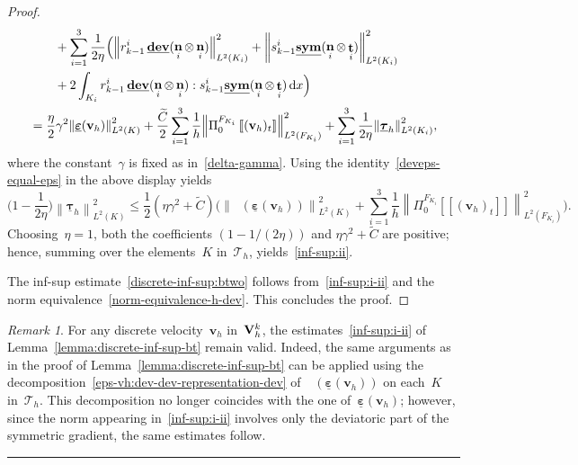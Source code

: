 \documentclass[a4paper,twoside,10pt]{article}
\theoremstyle{plain}
\theoremstyle{remark}
\newtheorem{remark}[theorem]{Remark}
\theoremstyle{definition}
\numberwithin{equation}{section}
\numberwithin{figure}{section}
\newcommand{\eremk}{\hbox{}\hfill\rule{0.8ex}{0.8ex}}
\newcommand{\Norm}[1]{{\left\|{#1} \right\|}}
\newcommand{\jump}[1]{\left[\!\left[#1\right]\!\right]}
\newcommand{\Tauh}{\mathcal{T}_h}
\newcommand{\K}{K}
\newcommand{\F}{F}
\newcommand{\Vh}{{\bf{V}}_h}
\newcommand{\Vhk}{\Vh^k}
\newcommand{\taubfh}{\underline{\boldsymbol{\tau}}_h}
\newcommand{\vbfh}{\mathbf{v}_h}
\DeclareMathOperator{\dev}{\underline{\mathbf{dev}}}
\newcommand{\sym}{\underline{\bf{sym}}}
\DeclareMathOperator{\norm}{\bf{n}}
\DeclareMathOperator{\tang}{\bf{t}}
\newcommand{\tangscalar}{t}
\newcommand{\Ltwo}{L^2}
\newcommand{\dx}{\, \mathrm{d}x}
\newcommand{\epsbfun}{\underline{\boldsymbol{\varepsilon}}}
\newcommand{\rkmoi}{r_{k-1}^i}
\newcommand{\skmoi}{s_{k-1}^i}
\newcommand{\Ki}{{\K_i}}
\newcommand{\Fi}{{\F_{\Ki}}}
\newcommand{\normi}{\norm_i}
\newcommand{\tangi}{\tang_i}
\newcommand{\PizFi}{\Pi_0^{\Fi}}
\newcommand{\Ctilde}{\widetilde{C}}
\begin{document}
\begin{proof}
\begin{equation*}
\begin{split}
&\qquad    + \sum_{i=1}^3 \frac{1}{2\eta}\Big(
            \Norm{\rkmoi \dev(\normi\otimes\normi)}^2_{\Ltwo(\Ki)}
          + \Norm{\skmoi \sym(\normi\otimes\tangi)}^2_{\Ltwo(\Ki)} \\
&\qquad   + 2\int_{\Ki} \rkmoi \dev(\normi\otimes\normi) : \skmoi \sym(\normi\otimes\tangi) \dx\Big) \\ 
&= \frac{\eta}{2}\gamma^2\Norm{\epsbfun(\vbfh)}^2_{\Ltwo(\K)}
    + \frac{\Ctilde}{2} \sum_{i=1}^3 \frac{1}{h} \Norm{\PizFi\jump{(\vbfh)_{\tangscalar}}}^2_{\Ltwo(\Fi)}
    + \sum_{i=1}^3 \frac{1}{2\eta}\Norm{\taubfh}^2_{\Ltwo(\Ki)},
\end{split}
\end{equation*}
where the constant~$\gamma$ is fixed as in~\eqref{delta-gamma}.
Using the identity~\eqref{deveps-equal-eps}
in the above display
yields
\begin{equation*} \label{upper-bound-taubfh}
\big(1-\frac{1}{2\eta}\big) \Norm{\taubfh}_{\Ltwo(\K)}^2
\leq \frac12(\eta\gamma^2 + \Ctilde) \Big(\Norm{\dev(\epsbfun(\vbfh))}_{\Ltwo(\K)}^2 + \sum_{i=1}^3 \frac{1}{h}\Norm{\PizFi\jump{(\vbfh)_{\tangscalar}}}^2_{\Ltwo(\Fi)}\Big).
\end{equation*}
Choosing~$\eta = 1$,
both the coefficients
$(1-1/(2\eta))$ and $\eta\gamma^2 + \Ctilde$ are positive;
hence,
summing over the elements~$\K$ in~$\Tauh$,
yields~\eqref{inf-sup:ii}.

The inf-sup estimate~\eqref{discrete-inf-sup:btwo}
follows from~\eqref{inf-sup:i-ii} and
the norm equivalence~\eqref{norm-equivalence-h-dev}.
This concludes the proof.
\end{proof}

\begin{remark} \label{remark:inf-sup}
For any discrete velocity~$\vbfh$ in~$\Vhk$,
the estimates~\eqref{inf-sup:i-ii} of Lemma~\ref{lemma:discrete-inf-sup-bt}
remain valid.
Indeed,
the same arguments as in the proof of Lemma~\ref{lemma:discrete-inf-sup-bt}
can be applied
using the decomposition~\eqref{eps-vh:dev-dev-representation-dev} of~$\dev(\epsbfun(\vbfh))$
on each~$\K$ in~$\Tauh$.
This decomposition no longer coincides with the one of~$\epsbfun(\vbfh)$;
however,
since the norm appearing in~\eqref{inf-sup:i-ii}
involves only the deviatoric part of the symmetric gradient,
the same estimates follow.
\eremk
\end{remark}
\end{document}
